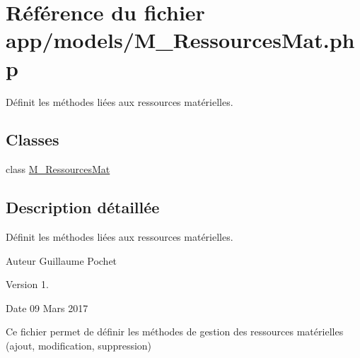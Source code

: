 \hypertarget{_m___ressources_mat_8php}{}\section{Référence du fichier app/models/\+M\+\_\+\+Ressources\+Mat.php}
\label{_m___ressources_mat_8php}


Définit les méthodes liées aux ressources matérielles.  


\subsection*{Classes}
\begin{DoxyCompactItemize}
\item 
class \hyperlink{class_m___ressources_mat}{M\+\_\+\+Ressources\+Mat}
\end{DoxyCompactItemize}


\subsection{Description détaillée}
Définit les méthodes liées aux ressources matérielles. 

\begin{DoxyAuthor}{Auteur}
Guillaume Pochet 
\end{DoxyAuthor}
\begin{DoxyVersion}{Version}
1. 
\end{DoxyVersion}
\begin{DoxyDate}{Date}
09 Mars 2017
\end{DoxyDate}
Ce fichier permet de définir les méthodes de gestion des ressources matérielles (ajout, modification, suppression) 